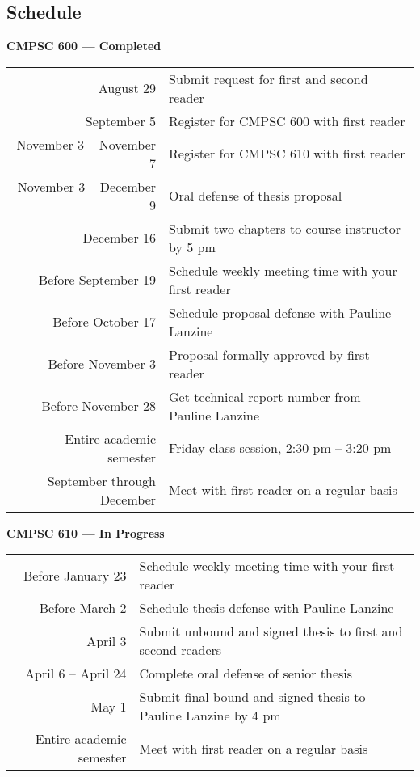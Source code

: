 \vspace*{-.25in}
\subsection*{Schedule}

{\bf CMPSC 600 --- Completed}
\begin{center}
\begin{tabular}{r|l}
\hline
August 29 & Submit request for first and second reader \\
September 5 & Register for CMPSC 600 with first reader \\
November 3 -- November 7 & Register for CMPSC 610 with first reader \\
November 3 -- December 9 & Oral defense of thesis proposal \\
December 16 & Submit two chapters to course instructor by 5 pm\\
\hline
Before September 19 & Schedule weekly meeting time with your first reader \\
Before October 17 & Schedule proposal defense with Pauline Lanzine \\
Before November 3 & Proposal formally approved by first reader \\
Before November 28 & Get technical report number from Pauline Lanzine \\
\hline
Entire academic semester & Friday class session, 2:30 pm -- 3:20 pm \\
September through December & Meet with first reader on a regular basis \\
\hline
\end{tabular}
\end{center}


\noindent
{\bf CMPSC 610 --- In Progress}
\begin{center}
\begin{tabular}{r|l}
\hline
Before January 23 & Schedule weekly meeting time with your first reader \\
Before March 2 & Schedule thesis defense with Pauline Lanzine \\
April 3 & Submit unbound and signed thesis to first and second readers \\
April 6 -- April 24 & Complete oral defense of senior thesis \\
May 1 & Submit final bound and signed thesis to Pauline Lanzine by 4 pm\\
\hline
Entire academic semester & Meet with first reader on a regular basis \\
\hline
\end{tabular}
\end{center}

